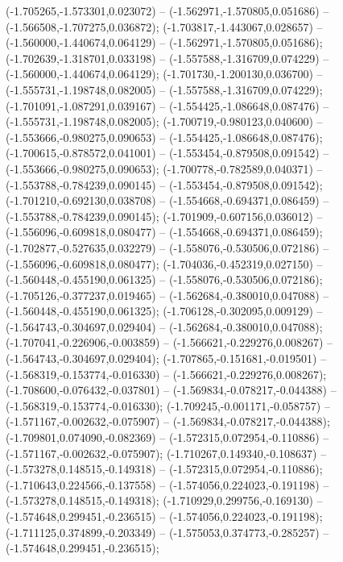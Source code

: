  (-1.705265,-1.573301,0.023072) -- (-1.562971,-1.570805,0.051686) -- (-1.566508,-1.707275,0.036872);
 (-1.703817,-1.443067,0.028657) -- (-1.560000,-1.440674,0.064129) -- (-1.562971,-1.570805,0.051686);
 (-1.702639,-1.318701,0.033198) -- (-1.557588,-1.316709,0.074229) -- (-1.560000,-1.440674,0.064129);
 (-1.701730,-1.200130,0.036700) -- (-1.555731,-1.198748,0.082005) -- (-1.557588,-1.316709,0.074229);
 (-1.701091,-1.087291,0.039167) -- (-1.554425,-1.086648,0.087476) -- (-1.555731,-1.198748,0.082005);
 (-1.700719,-0.980123,0.040600) -- (-1.553666,-0.980275,0.090653) -- (-1.554425,-1.086648,0.087476);
 (-1.700615,-0.878572,0.041001) -- (-1.553454,-0.879508,0.091542) -- (-1.553666,-0.980275,0.090653);
 (-1.700778,-0.782589,0.040371) -- (-1.553788,-0.784239,0.090145) -- (-1.553454,-0.879508,0.091542);
 (-1.701210,-0.692130,0.038708) -- (-1.554668,-0.694371,0.086459) -- (-1.553788,-0.784239,0.090145);
 (-1.701909,-0.607156,0.036012) -- (-1.556096,-0.609818,0.080477) -- (-1.554668,-0.694371,0.086459);
 (-1.702877,-0.527635,0.032279) -- (-1.558076,-0.530506,0.072186) -- (-1.556096,-0.609818,0.080477);
 (-1.704036,-0.452319,0.027150) -- (-1.560448,-0.455190,0.061325) -- (-1.558076,-0.530506,0.072186);
 (-1.705126,-0.377237,0.019465) -- (-1.562684,-0.380010,0.047088) -- (-1.560448,-0.455190,0.061325);
 (-1.706128,-0.302095,0.009129) -- (-1.564743,-0.304697,0.029404) -- (-1.562684,-0.380010,0.047088);
 (-1.707041,-0.226906,-0.003859) -- (-1.566621,-0.229276,0.008267) -- (-1.564743,-0.304697,0.029404);
 (-1.707865,-0.151681,-0.019501) -- (-1.568319,-0.153774,-0.016330) -- (-1.566621,-0.229276,0.008267);
 (-1.708600,-0.076432,-0.037801) -- (-1.569834,-0.078217,-0.044388) -- (-1.568319,-0.153774,-0.016330);
 (-1.709245,-0.001171,-0.058757) -- (-1.571167,-0.002632,-0.075907) -- (-1.569834,-0.078217,-0.044388);
 (-1.709801,0.074090,-0.082369) -- (-1.572315,0.072954,-0.110886) -- (-1.571167,-0.002632,-0.075907);
 (-1.710267,0.149340,-0.108637) -- (-1.573278,0.148515,-0.149318) -- (-1.572315,0.072954,-0.110886);
 (-1.710643,0.224566,-0.137558) -- (-1.574056,0.224023,-0.191198) -- (-1.573278,0.148515,-0.149318);
 (-1.710929,0.299756,-0.169130) -- (-1.574648,0.299451,-0.236515) -- (-1.574056,0.224023,-0.191198);
 (-1.711125,0.374899,-0.203349) -- (-1.575053,0.374773,-0.285257) -- (-1.574648,0.299451,-0.236515);
